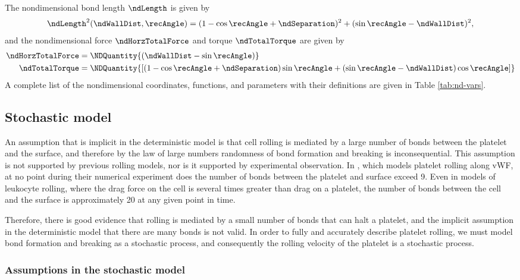 The nondimensional bond length $\ndLength$ is given by
\begin{equation}
  \label{eq:nd-length}
  \ndLength^2(\ndWallDist, \recAngle) = (1 - \cos\recAngle +
  \ndSeparation)^2 + (\sin\recAngle - \ndWallDist)^2,
\end{equation}
and the nondimensional force $\ndHorzTotalForce$ and torque
$\ndTotalTorque$ are given by
\begin{align}
  \label{eq:nd-force}
  \ndHorzTotalForce &= \NDQuantity{(\ndWallDist - \sin\recAngle)} \\
  \label{eq:nd-torque}
  \ndTotalTorque &= \NDQuantity{\left[ \left(1 - \cos\recAngle +
                   \ndSeparation\right) \sin\recAngle +
                   \left(\sin\recAngle - \ndWallDist\right)
                   \cos\recAngle \right]}
\end{align}
A complete list of the nondimensional coordinates, functions, and
parameters with their definitions are given in Table
\ref{tab:nd-vars}.

\subsection{Stochastic model}
\label{sec:stochastic-model}

An assumption that is implicit in the deterministic model is that cell
rolling is mediated by a large number of bonds between the platelet
and the surface, and therefore by the law of large numbers randomness
of bond formation and breaking is inconsequential. This assumption is
not supported by previous rolling models, nor is it supported by
experimental observation. In \cite{Wang2013}, which models platelet
rolling along vWF, at no point during their numerical experiment does
the number of bonds between the platelet and surface exceed 9. Even in
models of leukocyte rolling, where the drag force on the cell is
several times greater than drag on a platelet, the number of bonds
between the cell and the surface is approximately 20 at any given
point in time.

Therefore, there is good evidence that rolling is mediated by a small
number of bonds that can halt a platelet, and the implicit assumption
in the deterministic model that there are many bonds is not valid. In
order to fully and accurately describe platelet rolling, we must model
bond formation and breaking as a stochastic process, and consequently
the rolling velocity of the platelet is a stochastic process.

\subsubsection{Assumptions in the stochastic model}
\label{sec:assumpt-stoch-model}

